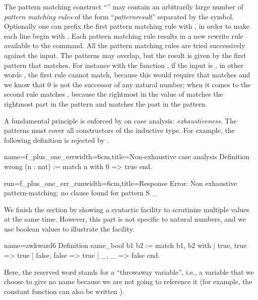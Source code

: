The pattern matching construct ``'' may contain an
arbitrarily large number of {\em pattern matching rules} of the form
``\emph{pattern}\C{ =>$~$}\emph{result}''
separated by the \C{|} symbol.  Optionally one can
prefix the first pattern matching rule with \C{|}, in order to make each line
begin with \C{|}. Each pattern matching rule results in a new rewrite
rule available to the  command.
All
the pattern matching rules are tried successively against the input.  The
patterns may overlap, but the result is given by the first pattern that
matches.
For instance with the function , if the input is
, in other words , the first
rule cannot match, because this would require that  matches
 and we know that \(0\) is not the successor of any
natural number; when it comes to the second rule  matches
, because the rightmost  in the value of  matches
the rightmost  part in the pattern and  matches the  part
in the pattern.

A fundamental principle is enforced by \Coq{} on case analysis:
\emph{exhaustiveness}.  The patterns must cover all constructors of
the inductive type.  For example, the following definition is
rejected by \Coq{}.

\begin{coq-left}{name=f_plus_one_err}{width=6cm,title=Non-exhaustive case analysis}
Definition wrong (n : nat) :=
  match n with 0 => true end.
$~$
\end{coq-left}
\begin{coqout-right}{run=f_plus_one_err_run}{width=6cm,title=Response}
Error: Non exhaustive pattern-matching:
no clause found for
pattern S _
\end{coqout-right}

We finish the section by showing a syntactic facility to scrutinize
multiple values at the same time.  However, this part is not specific to
natural numbers, and we use boolean values to illustrate the facility.

\begin{coq}{name=awkward6}{}
Definition same_bool b1 b2 :=
  match b1, b2 with
  | true, true => true
  | false, false => true
  | _, _ => false
  end.
\end{coq}

Here, the reserved word \C{_} stands for a ``throwaway variable'', i.e.,
a variable that we choose to give no name because we are not going to
reference it (for example, the constant function
 can also be written
).
\index[coq]{\C{_}}

